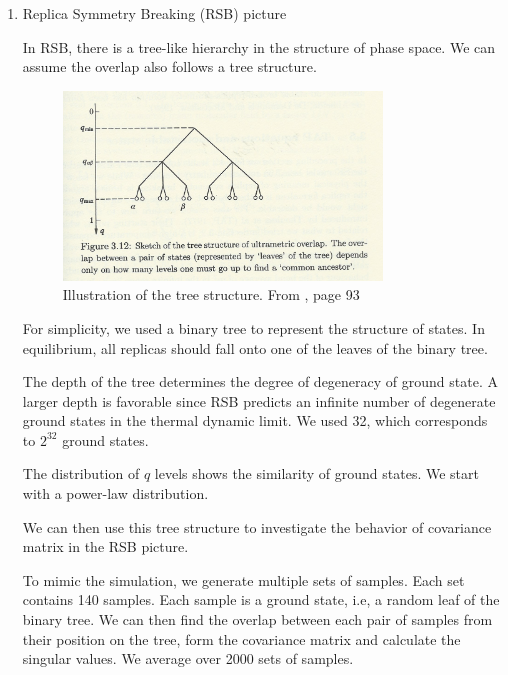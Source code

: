 \begin{enumerate}
\item{Replica Symmetry Breaking (RSB) picture}

In RSB, there is a tree-like hierarchy in the structure of phase space.
We can assume the overlap also follows a tree structure. 

\begin{figure}[ht]
  \centering
  \includegraphics[width=0.8\textwidth]{img/matrix/tree.png}
  \caption{Illustration of the tree structure. From \citet{Fischer-Hertz-1993}, page 93}
  \label{fig:tree}
\end{figure}


For simplicity, we used a binary tree to represent the structure of states. 
In equilibrium, all replicas should fall onto one of the leaves of the binary tree. 

The depth of the tree determines the degree of degeneracy of ground state. 
A larger depth is favorable since RSB predicts an infinite number of 
degenerate ground states in the thermal dynamic limit. We used 32,
 which corresponds to $2^{32}$ ground states.


The distribution of $q$ levels shows the similarity of ground states.
We start with a power-law distribution. 

We can then use this tree structure to investigate the behavior of covariance matrix
in the RSB picture.

To mimic the simulation, we generate multiple sets of samples. Each set contains
140 samples. Each sample is a ground state, i.e, a random leaf of the binary tree. 
We can then find the overlap between each pair of samples 
from their position on the tree, form the covariance
matrix and calculate the singular values. 
We average over 2000 sets of samples.


\end{enumerate}
